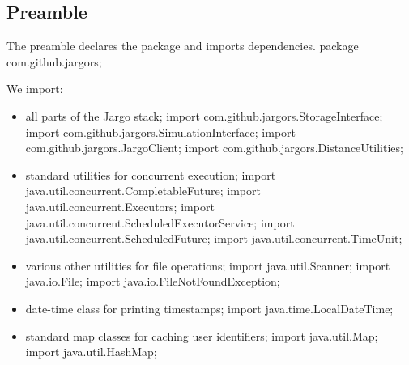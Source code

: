 \documentclass{article}
\def\nwendcode{\endtrivlist \endgroup}      %
\let\nwdocspar=\par
\begin{document}
\subsection{Preamble}
\label{sec:preamble}
The preamble declares the package and imports dependencies.
\nwenddocs{}\endmoddef{}
package com.github.jargors;
\nwendcode{}\nwdocspar
We import:
\begin{itemize}
\item all parts of the Jargo stack;
\nwenddocs{}\plusendmoddef
import com.github.jargors.StorageInterface;
import com.github.jargors.SimulationInterface;
import com.github.jargors.JargoClient;
import com.github.jargors.DistanceUtilities;
\nwendcode{}\item standard utilities for concurrent execution;
\nwenddocs{}\plusendmoddef
import java.util.concurrent.CompletableFuture;
import java.util.concurrent.Executors;
import java.util.concurrent.ScheduledExecutorService;
import java.util.concurrent.ScheduledFuture;
import java.util.concurrent.TimeUnit;
\nwendcode{}\item various other utilities for file operations;
\nwenddocs{}\plusendmoddef
import java.util.Scanner;
import java.io.File;
import java.io.FileNotFoundException;
\nwendcode{}\item date-time class for printing timestamps;
\nwenddocs{}\plusendmoddef
import java.time.LocalDateTime;
\nwendcode{}\item standard map classes for caching user identifiers;
\nwenddocs{}\plusendmoddef
import java.util.Map;
import java.util.HashMap;
\nwendcode{}\nwdocspar
\end{itemize}
\end{document}

